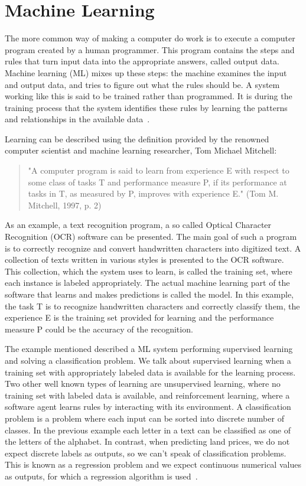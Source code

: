 \documentclass[a4paper,oneside,onecolumn,12pt]{book}
\begin{document}
\section{Machine Learning}
The more common way of making a computer do work is to execute a computer program created by a human programmer. This program contains the steps and rules that turn input data into the appropriate answers, called output data. Machine learning (ML) mixes up these steps: the machine examines the input and output data, and tries to figure out what the rules should be. A system working like this is said to be trained rather than programmed. It is during the training process that the system identifies these rules by learning the patterns and relationships in the available data~\cite{DLP}.

Learning can be described using the definition provided by the renowned computer scientist and machine learning researcher, Tom Michael Mitchell:
\begin{quote}
	"A computer program is said to learn from experience E with respect to some class of tasks T and performance measure P, if its performance at tasks in T, as measured by P, improves with experience E." (Tom M. Mitchell, 1997, p. 2)\cite{ML}
\end{quote}
As an example, a text recognition program, a so called Optical Character Recognition (OCR) software can be presented. The main goal of such a program is to correctly recognize and convert handwritten characters into digitized text. A collection of texts written in various styles is presented to the OCR software. This collection, which the system uses to learn, is called the training set, where each instance is labeled appropriately. The actual machine learning part of the software that learns and makes predictions is called the model. In this example, the task T is to recognize handwritten characters and correctly classify them, the experience E is the training set provided for learning and the performance measure P could be the accuracy of the recognition.

The example mentioned described a ML system performing supervised learning and solving a classification problem. We talk about supervised learning when a training set with appropriately labeled data is available for the learning process. Two other well known types of learning are unsupervised learning, where no training set with labeled data is available, and reinforcement learning, where a software agent learns rules by interacting with its environment. A classification problem is a problem where each input can be sorted into discrete number of classes. In the previous example each letter in a text can be classified as one of the letters of the alphabet. In contrast, when predicting land prices, we do not expect discrete labels as outputs, so we can't speak of classification problems. This is known as a regression problem and we expect continuous numerical values as outputs, for which a regression algorithm is used~\cite{AISL}.
\end{document}
